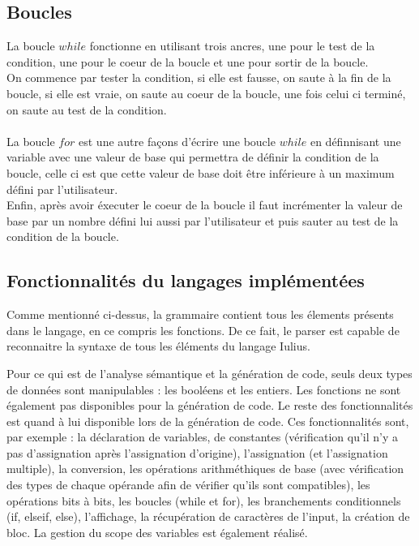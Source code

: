 \documentclass[a4paper,10pt]{article}
\begin{document}
\subsection{Boucles}
La boucle $while$ fonctionne en utilisant trois ancres, une pour le test de la condition, une pour le coeur de la boucle et une pour sortir de la boucle.\\
On commence par tester la condition, si elle est fausse, on saute à la fin de la boucle, si elle est vraie, on saute au coeur de la boucle, une fois celui ci terminé, on saute au test de la condition.\\\\
La boucle $for$ est une autre façons d'écrire une boucle $while$ en définnisant une variable avec une valeur de base qui permettra de définir la condition de la boucle, celle ci est que cette valeur de base doit être inférieure à un maximum défini par l'utilisateur.\\
Enfin, après avoir éxecuter le coeur de la boucle il faut incrémenter la valeur de base par un nombre défini lui aussi par l'utilisateur et puis sauter au test de la condition de la boucle.

\subsection{Fonctionnalités du langages implémentées}
Comme mentionné ci-dessus, la grammaire contient tous les élements présents dans le langage, en ce compris les fonctions. De ce fait, le parser est capable de reconnaitre la syntaxe de tous les éléments du langage Iulius.

Pour ce qui est de l'analyse sémantique et la génération de code, seuls deux types de données sont manipulables : les booléens et les entiers. Les fonctions ne sont également pas disponibles pour la génération de code. Le reste des fonctionnalités est quand à lui disponible lors de la génération de code. Ces fonctionnalités sont, par exemple : la déclaration de variables, de constantes (vérification qu'il n'y a pas d'assignation après l'assignation d'origine), l'assignation (et l'assignation multiple), la conversion, les opérations arithméthiques de base (avec vérification des types de chaque opérande afin de vérifier qu'ils sont compatibles), les opérations bits à bits, les boucles (while et for), les branchements conditionnels (if, elseif, else), l'affichage, la récupération de caractères de l'input, la création de bloc. 
La gestion du scope des variables est également réalisé.
\end{document}
